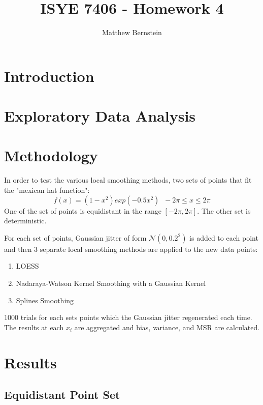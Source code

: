 \documentclass[12pt,letterpaper]{article}
\title{ISYE 7406 - Homework 4}
\author{Matthew Bernstein}
\begin{document}
\maketitle

\section*{Introduction}
\section*{Exploratory Data Analysis}
\section*{Methodology}

In order to test the various local smoothing methods, two sets of points that fit the "mexican hat function":
\begin{equation}
    f(x) = (1-x^2)exp(-0.5 x^2)\;\; -2\pi \le x \le 2\pi
\end{equation}
One of the set of points is equidistant in the range $[-2\pi, 2\pi]$. The other set is deterministic. 

For each set of points, Gaussian jitter of form $\mathcal{N}(0,0.2^2)$ is added to each point and then 3 separate local smoothing methods are applied to the new data points:
\begin{enumerate}
    \item LOESS
    \item Nadaraya-Watson Kernel Smoothing with a Gaussian Kernel
    \item Splines Smoothing
\end{enumerate}

1000 trials for each sets points which the Gaussian jitter regenerated each time. The results at each $x_i$ are aggregated and bias, variance, and MSR are calculated.

\section*{Results}

\subsection*{Equidistant Point Set}
\end{document}
